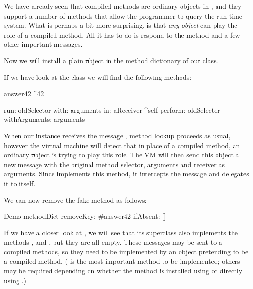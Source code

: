 \documentclass[a4paper,10pt,twoside]{book}
\begin{document}
We have already seen that compiled methods are ordinary objects in \st, and they support a number of methods that allow the programmer to query the run-time system.
What is perhaps a bit more surprising, is that \emph{any object} can play the role of a compiled method. All it has to do is respond to the method  and a few other important messages.


Now we will install a plain \st object in the method dictionary of our  class.


If we have look at the class  we will find the following methods: 
\begin{code}{}
answer42
	^42

run: oldSelector with: arguments in: aReceiver
	^self perform: oldSelector withArguments: arguments
\end{code}

When our  instance receives the message , method lookup proceeds as usual, however the virtual machine will detect that in place of a compiled method, an ordinary \st object is trying to play this role.
The VM will then send this object a new message  with the original method selector, arguments and receiver as arguments.
Since  implements this method, it intercepts the message and delegates it to itself.

We can now remove the fake method as follows:
\begin{code}{}
Demo methodDict removeKey: #answer42 ifAbsent: []
\end{code}

If we have a closer look at , we will see that its superclass also implements the methods ,  and , but they are all empty.  These messages may be sent to a compiled methods, so they need to be implemented by an object pretending to be a compiled method.  ( is the most important method to be implemented; others may be required depending on whether the method is installed using  or directly using .)
\end{document}
